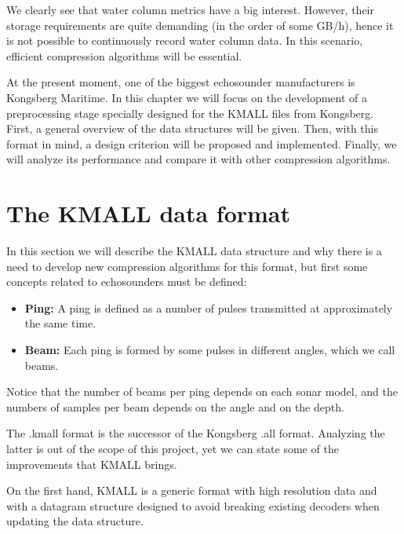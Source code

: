 We clearly see that water column metrics have a big interest. However, their storage requirements are quite demanding (in the order of some GB/h), hence it is not possible to continuously record water column data. In this scenario, efficient compression algorithms will be essential.

At the present moment, one of the biggest echosounder manufacturers is Kongsberg Maritime. In this chapter we will focus on the development of a preprocessing stage specially designed for the KMALL files from Kongsberg. First, a general overview of the data structures will be given. Then, with this format in mind, a design criterion will be proposed and implemented. Finally, we will analyze its performance and compare it with other compression algorithms.

\section{The KMALL data format}

In this section we will describe the KMALL data structure and why there is a need to develop new compression algorithms for this format, but first some concepts related to echosounders must be defined:
\begin{itemize}
	\item \textbf{Ping:} A ping is defined as a number of pulses transmitted at approximately the same time.
	\item \textbf{Beam:} Each ping is formed by some pulses in different angles, which we call beams.
\end{itemize}

Notice that the number of beams per ping depends on each sonar model, and the numbers of samples per beam depends on the angle and on the depth.

The .kmall format is the successor of the Kongsberg .all format. Analyzing the latter is out of the scope of this project, yet we can state some of the improvements that KMALL brings. 

On the first hand, KMALL is a generic format with high resolution data and with a datagram structure designed to avoid breaking existing decoders when updating the data structure.

